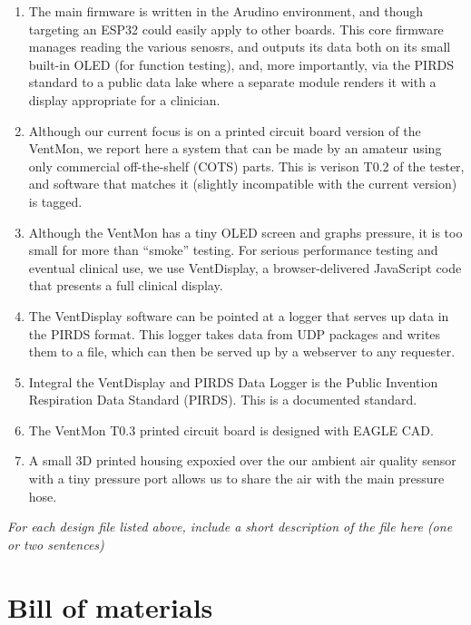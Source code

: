 \documentclass[11pt, letterpaper]{article}
\begin{document}
\begin{enumerate}
\item The main firmware is written in the Arudino environment, and though targeting an ESP32 could easily apply to other boards.
This core firmware manages reading the various senosrs, and
outputs its data both on its small built-in OLED (for function testing), and,
more importantly, via the PIRDS standard to a public data lake where a separate module renders it with a display appropriate
for a clinician.
\item Although our current focus is on a printed circuit board version of the VentMon\cite{ventmonpcb},
  we report here a system that can be made by an amateur using only commercial off-the-shelf (COTS) parts.
  This is verison T0.2 of the tester, and software that matches it (slightly incompatible with the current version) is tagged.
\item Although the VentMon has a tiny OLED screen and graphs pressure, it is too small for more than ``smoke'' testing. For serious performance testing and eventual clinical use, we
  use VentDisplay, a browser-delivered JavaScript code that presents a full clinical display.
\item The VentDisplay software can be pointed at a logger that serves up data in the PIRDS format. This logger takes data from UDP packages and writes them to a file, which can then be
  served up by a webserver to any requester.
\item Integral the VentDisplay and PIRDS Data Logger is the Public Invention Respiration Data Standard (PIRDS). This is a documented standard.
\item The VentMon T0.3 printed circuit board is designed with EAGLE CAD.
  \item A small 3D printed housing expoxied over the our ambient air quality sensor with a tiny pressure port allows us to share the air with the main pressure hose.
\end{enumerate}



\textit{For each design file listed above, include a short description of the file here (one or two sentences)}

\section{Bill of materials}
\end{document}
